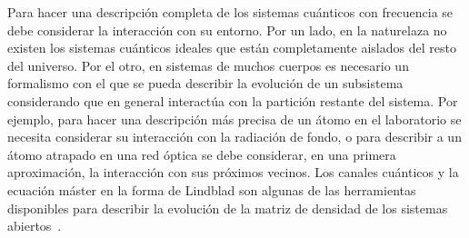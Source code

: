 %
%



Para hacer una descripción completa de los sistemas cuánticos 
con frecuencia se debe considerar la interacción con su entorno. Por un lado, 
en la naturelaza no existen los sistemas cuánticos ideales que 
están completamente aislados del resto del universo. 
Por el otro, en sistemas de muchos cuerpos es necesario un formalismo
con el que se pueda describir la evolución de un subsistema considerando
que en general interactúa con la partición restante del sistema.
Por ejemplo, para hacer una descripción más precisa de un átomo en el laboratorio se
necesita considerar su interacción con la radiación de fondo, 
o para describir a un átomo atrapado en una red óptica se debe considerar, 
en una primera aproximación, la interacción con sus próximos vecinos.
Los canales cuánticos y la ecuación máster en la forma de Lindblad son algunas de las herramientas 
disponibles para describir la evolución de la matriz de densidad de
los sistemas abiertos~\cite{nielsen_chuang_2011}. 




